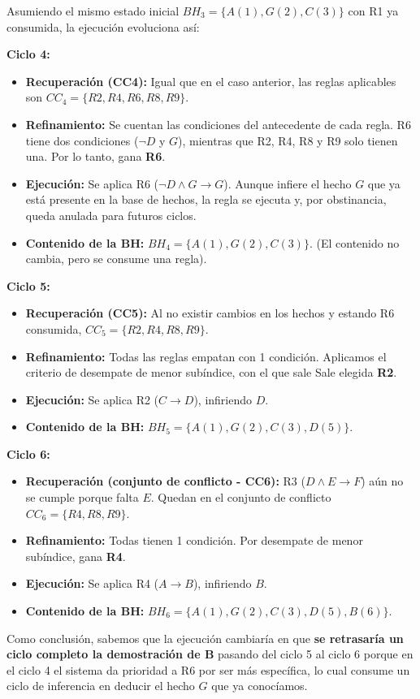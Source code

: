 \documentclass[11pt, a4paper]{article}
\newenvironment{problem}[1][Cuestión]{
	\vspace{0.5cm}
	\noindent{\Large\bfseries #1} \par\vspace{0.5cm}
}{
	\vspace{0.5cm}
}
\begin{document}
\begin{problem}[Problema 2 (30 \%)]
\begin{enumerate}[label=\alph*)]
{				Asumiendo el mismo estado inicial $BH_3 = \{ A(1), G(2), C(3) \}$ con R1 ya consumida, la ejecución evoluciona así:

				\textbf{Ciclo 4:}
				\begin{itemize}
					\item \textbf{Recuperación (CC4):} Igual que en el caso anterior, las reglas aplicables son $CC_4 = \{ R2, R4, R6, R8, R9 \}$.
					\item \textbf{Refinamiento:} Se cuentan las condiciones del antecedente de cada regla. R6 tiene dos condiciones ($\neg D$ y $G$), mientras que R2, R4, R8 y R9 solo tienen una. Por lo tanto, gana \textbf{R6}.
					\item \textbf{Ejecución:} Se aplica R6 ($\neg D \wedge G \rightarrow G$). Aunque infiere el hecho $G$ que ya está presente en la base de hechos, la regla se ejecuta y, por obstinancia, queda anulada para futuros ciclos.
					\item \textbf{Contenido de la BH:} $BH_4 = \{ A(1), G(2), C(3) \}$. (El contenido no cambia, pero se consume una regla).
				\end{itemize}

				\textbf{Ciclo 5:}
				\begin{itemize}
					\item \textbf{Recuperación (CC5):} Al no existir cambios en los hechos y estando R6 consumida, $CC_5 = \{ R2, R4, R8, R9 \}$.
					\item \textbf{Refinamiento:} Todas las reglas empatan con 1 condición. Aplicamos el criterio de desempate de menor subíndice, con el que sale Sale elegida \textbf{R2}.
					\item \textbf{Ejecución:} Se aplica R2 ($C \rightarrow D$), infiriendo $D$.
					\item \textbf{Contenido de la BH:} $BH_5 = \{ A(1), G(2), C(3), D(5) \}$.
				\end{itemize}

				\textbf{Ciclo 6:}
				\begin{itemize}
					\item \textbf{Recuperación (conjunto de conflicto - CC6):} R3 ($D \wedge E \rightarrow F$) aún no se cumple porque falta $E$. Quedan en el conjunto de conflicto $CC_6 = \{ R4, R8, R9 \}$.
					\item \textbf{Refinamiento:} Todas tienen 1 condición. Por desempate de menor subíndice, gana \textbf{R4}.
					\item \textbf{Ejecución:} Se aplica R4 ($A \rightarrow B$), infiriendo $B$.
					\item \textbf{Contenido de la BH:} $BH_6 = \{ A(1), G(2), C(3), D(5), B(6) \}$.
				\end{itemize}

				Como conclusión, sabemos que la ejecución cambiaría en que \textbf{se retrasaría un ciclo completo la demostración de B} pasando del ciclo 5 al ciclo 6 porque en el ciclo 4 el sistema da prioridad a R6 por ser más específica, lo cual consume un ciclo de inferencia en deducir el hecho $G$ que ya conocíamos.
			}
		\end{enumerate}
	\end{problem}
\end{document}
